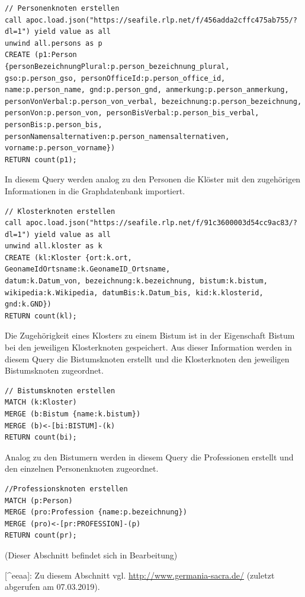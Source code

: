 \documentclass[ngerman,]{scrreprt}
\begin{document}
\begin{verbatim}
// Personenknoten erstellen
call apoc.load.json("https://seafile.rlp.net/f/456adda2cffc475ab755/?dl=1") yield value as all
unwind all.persons as p
CREATE (p1:Person {personBezeichnungPlural:p.person_bezeichnung_plural, gso:p.person_gso, personOfficeId:p.person_office_id, name:p.person_name, gnd:p.person_gnd, anmerkung:p.person_anmerkung, personVonVerbal:p.person_von_verbal, bezeichnung:p.person_bezeichnung, personVon:p.person_von, personBisVerbal:p.person_bis_verbal, personBis:p.person_bis, personNamensalternativen:p.person_namensalternativen, vorname:p.person_vorname})
RETURN count(p1);
\end{verbatim}

In diesem Query werden analog zu den Personen die Klöster mit den zugehörigen Informationen in die Graphdatenbank importiert.

\begin{verbatim}
// Klosterknoten erstellen
call apoc.load.json("https://seafile.rlp.net/f/91c3600003d54cc9ac83/?dl=1") yield value as all
unwind all.kloster as k
CREATE (kl:Kloster {ort:k.ort,
GeonameIdOrtsname:k.GeonameID_Ortsname,
datum:k.Datum_von, bezeichnung:k.bezeichnung, bistum:k.bistum, wikipedia:k.Wikipedia, datumBis:k.Datum_bis, kid:k.klosterid, gnd:k.GND})
RETURN count(kl);
\end{verbatim}

Die Zugehörigkeit eines Klosters zu einem Bistum ist in der Eigenschaft Bistum bei den jeweiligen Klosterknoten gespeichert. Aus dieser Information werden in diesem Query die Bistumsknoten erstellt und die Klosterknoten den jeweiligen Bistumsknoten zugeordnet.

\begin{verbatim}
// Bistumsknoten erstellen
MATCH (k:Kloster)
MERGE (b:Bistum {name:k.bistum})
MERGE (b)<-[bi:BISTUM]-(k)
RETURN count(bi);
\end{verbatim}

Analog zu den Bistumern werden in diesem Query die Professionen erstellt und den einzelnen Personenknoten zugeordnet.

\begin{verbatim}
//Professionsknoten erstellen
MATCH (p:Person)
MERGE (pro:Profession {name:p.bezeichnung})
MERGE (pro)<-[pr:PROFESSION]-(p)
RETURN count(pr);
\end{verbatim}

(Dieser Abschnitt befindet sich in Bearbeitung)

{[}\^{}eeaa{]}: Zu diesem Abschnitt vgl. \url{http://www.germania-sacra.de/} (zuletzt abgerufen am 07.03.2019).
\end{document}
